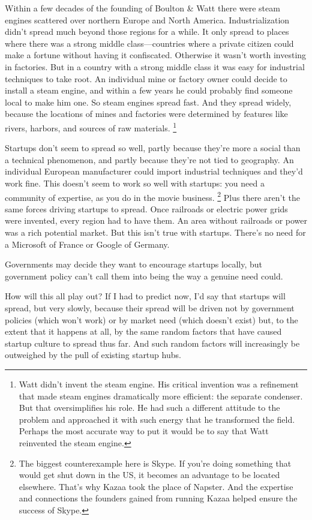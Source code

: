 \documentclass[12pt]{book}
\begin{document}
Within a few decades of the founding of Boulton \& Watt there were steam
engines scattered over northern Europe and North America.
Industrialization didn't spread much beyond those regions for a while.
It only spread to places where there was a strong middle
class---countries where a private citizen could make a fortune without
having it confiscated. Otherwise it wasn't worth investing in factories.
But in a country with a strong middle class it was easy for industrial
techniques to take root. An individual mine or factory owner could
decide to install a steam engine, and within a few years he could
probably find someone local to make him one. So steam engines spread
fast. And they spread widely, because the locations of mines and
factories were determined by features like rivers, harbors, and sources
of raw materials. \footnote{Watt didn't invent the steam engine. His critical invention was
a refinement that made steam engines dramatically more efficient: the
separate condenser. But that oversimplifies his role. He had such a
different attitude to the problem and approached it with such energy
that he transformed the field. Perhaps the most accurate way to put it
would be to say that Watt reinvented the steam engine.}

Startups don't seem to spread so well, partly because they're more a
social than a technical phenomenon, and partly because they're not tied
to geography. An individual European manufacturer could import
industrial techniques and they'd work fine. This doesn't seem to work so
well with startups: you need a community of expertise, as you do in the
movie business. \footnote{The biggest counterexample here is Skype. If you're doing
something that would get shut down in the US, it becomes an advantage to
be located elsewhere. That's why Kazaa took the place of Napster. And
the expertise and connections the founders gained from running Kazaa
helped ensure the success of Skype.} Plus there aren't the same
forces driving startups to spread. Once railroads or electric power
grids were invented, every region had to have them. An area without
railroads or power was a rich potential market. But this isn't true with
startups. There's no need for a Microsoft of France or Google of
Germany.

Governments may decide they want to encourage startups locally, but
government policy can't call them into being the way a genuine need
could.

How will this all play out? If I had to predict now, I'd say that
startups will spread, but very slowly, because their spread will be
driven not by government policies (which won't work) or by market need
(which doesn't exist) but, to the extent that it happens at all, by the
same random factors that have caused startup culture to spread thus far.
And such random factors will increasingly be outweighed by the pull of
existing startup hubs.
\end{document}
